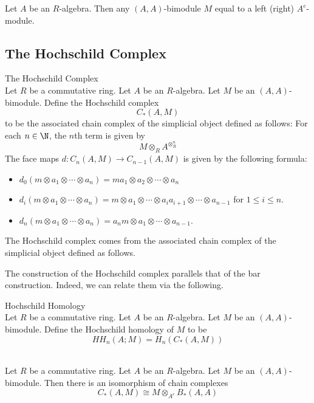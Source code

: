 \documentclass[a4paper]{article}
\begin{document}
\begin{prp}{}{} Let $A$ be an $R$-algebra. Then any $(A,A)$-bimodule $M$ equal to a left (right) $A^e$-module. 
\end{prp}

\subsection{The Hochschild Complex}
\begin{defn}{The Hochschild Complex}{}\\
Let $R$ be a commutative ring. Let $A$ be an $R$-algebra. Let $M$ be an $(A,A)$-bimodule. Define the Hochschild complex $$C_\ast(A,M)$$ to be the associated chain complex of the simplicial object defined as follows: For each $n\in\N$, the $n$th term is given by $$M\otimes_RA^{\otimes_R^n}$$ The face maps $d:C_n(A,M)\to C_{n-1}(A,M)$ is given by the following formula: 
\begin{itemize}
\item $d_0(m\otimes a_1\otimes\cdots\otimes a_n)=ma_1\otimes a_2\otimes\cdots\otimes a_n$
\item $d_i(m\otimes a_1\otimes\cdots\otimes a_n)=m\otimes a_1\otimes\cdots\otimes a_ia_{i+1}\otimes \cdots\otimes a_{n-1}$ for $1\leq i\leq n$. 
\item $d_n(m\otimes a_1\otimes\cdots\otimes a_n)=a_nm\otimes a_1\otimes\cdots\otimes a_{n-1}$. 
\end{itemize}
\end{defn}

The Hochschild complex comes from the associated chain complex of the simplicial object defined as follows. 

The construction of the Hochschild complex parallels that of the bar construction. Indeed, we can relate them via the following. 

\begin{defn}{Hochschild Homology}{}\\
Let $R$ be a commutative ring. Let $A$ be an $R$-algebra. Let $M$ be an $(A,A)$-bimodule. Define the Hochschild homology of $M$ to be $$HH_n(A;M)=H_n(C_\ast(A,M))$$
\end{defn}

\begin{prp}{}{}\\
Let $R$ be a commutative ring. Let $A$ be an $R$-algebra. Let $M$ be an $(A,A)$-bimodule. Then there is an isomorphism of chain complexes $$C_\ast(A,M)\cong M\otimes_{A^e} B_\ast(A,A)$$
\end{prp}
\end{document}

